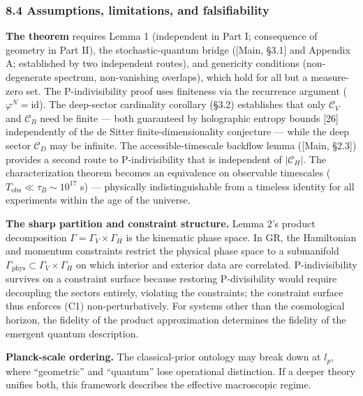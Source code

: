 \documentclass[
]{article}
\begin{document}
\hypertarget{assumptions-limitations-and-falsifiability}{%
\subsubsection{8.4 Assumptions, limitations, and
falsifiability}\label{assumptions-limitations-and-falsifiability}}

\textbf{The theorem} requires Lemma 1 (independent in Part I;
consequence of geometry in Part II), the stochastic-quantum bridge
({[}Main, §3.1{]} and Appendix A; established by two independent
routes), and genericity conditions (non-degenerate spectrum,
non-vanishing overlaps), which hold for all but a measure-zero set. The
P-indivisibility proof uses finiteness via the recurrence argument
(\(\varphi^N = \text{id}\)). The deep-sector cardinality corollary
(§3.2) establishes that only \(\mathcal{C}_V\) and \(\mathcal{C}_B\)
need be finite --- both guaranteed by holographic entropy bounds
{[}26{]} independently of the de Sitter finite-dimensionality conjecture
--- while the deep sector \(\mathcal{C}_D\) may be infinite. The
accessible-timescale backflow lemma ({[}Main, §2.3{]}) provides a second
route to P-indivisibility that is independent of \(|\mathcal{C}_H|\).
The characterization theorem becomes an equivalence on observable
timescales (\(T_{\text{obs}} \ll \tau_B \sim 10^{17}\) s) --- physically
indistinguishable from a timeless identity for all experiments within
the age of the universe.

\textbf{The sharp partition and constraint structure.} Lemma 2's product
decomposition \(\Gamma = \Gamma_V \times \Gamma_H\) is the kinematic
phase space. In GR, the Hamiltonian and momentum constraints restrict
the physical phase space to a submanifold
\(\Gamma_{\text{phys}} \subset \Gamma_V \times \Gamma_H\) on which
interior and exterior data are correlated. P-indivisibility survives on
a constraint surface because restoring P-divisibility would require
decoupling the sectors entirely, violating the constraints; the
constraint surface thus enforces (C1) non-perturbatively. For systems
other than the cosmological horizon, the fidelity of the product
approximation determines the fidelity of the emergent quantum
description.

\textbf{Planck-scale ordering.} The classical-prior ontology may break
down at \(l_p\), where ``geometric'' and ``quantum'' lose operational
distinction. If a deeper theory unifies both, this framework describes
the effective macroscopic regime.
\end{document}
